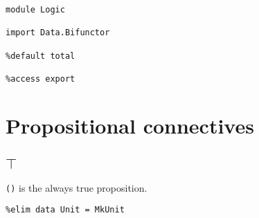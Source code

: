 \documentclass{acm_proc_article-sp}
\begin{document}



% 
% 

\begin{verbatim}
module Logic

import Data.Bifunctor

%default total

%access export
\end{verbatim}

\section{Propositional connectives}\label{propositional-connectives}

\subsection{\texorpdfstring{\(\top\)}{\textbackslash{}top}}\label{top}

\texttt{()} is the always true proposition.

\begin{verbatim}
%elim data Unit = MkUnit
\end{verbatim}
\end{document}
